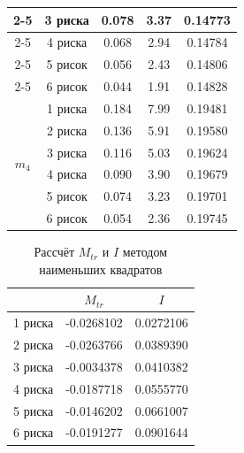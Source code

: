\documentclass[12pt]{article}
\begin{document}
\begin{table}[h]
\begin{tabular}{|c|c|c|c|c|}
        \cline{2-5}
        & 3 риска & 0.078 & 3.37 & 0.14773 \\
        \cline{2-5}
        & 4 риска & 0.068 & 2.94 & 0.14784 \\
        \cline{2-5}
        & 5 рисок & 0.056 & 2.43 & 0.14806 \\
        \cline{2-5}
        & 6 рисок & 0.044 & 1.91 & 0.14828 \\
        \hline
        \multirow{6}{*}{$m_4$} & 1 риска & 0.184 & 7.99 & 0.19481 \\
        \cline{2-5}
        & 2 риска & 0.136 & 5.91 & 0.19580 \\
        \cline{2-5}
        & 3 риска & 0.116 & 5.03 & 0.19624 \\
        \cline{2-5}
        & 4 риска & 0.090 & 3.90 & 0.19679 \\
        \cline{2-5}
        & 5 рисок & 0.074 & 3.23 & 0.19701 \\
        \cline{2-5}
        & 6 рисок & 0.054 & 2.36 & 0.19745 \\
        \hline
    \end{tabular}
\end{table}


\newpage


\begin{table}[h]
    \centering
    \renewcommand{\arraystretch}{1.3}
    \setlength{\tabcolsep}{8pt}
    \captionsetup{justification=centering, font=bf}
    \caption{Рассчёт $ M_{tr} $ и $ I $ методом наименьших квадратов}
    \begin{tabular}{|c|c|c|}
        \hline
        & $ M_{tr} $ & $ I $ \\
        \hline
        1 риска & -0.0268102 & 0.0272106 \\
        \hline
        2 риска & -0.0263766 & 0.0389390 \\
        \hline
        3 риска & -0.0034378 & 0.0410382 \\
        \hline
        4 риска & -0.0187718 & 0.0555770 \\
        \hline
        5 риска & -0.0146202 & 0.0661007 \\
        \hline
        6 риска & -0.0191277 & 0.0901644 \\
        \hline

    \end{tabular}
\end{table}
\end{document}
